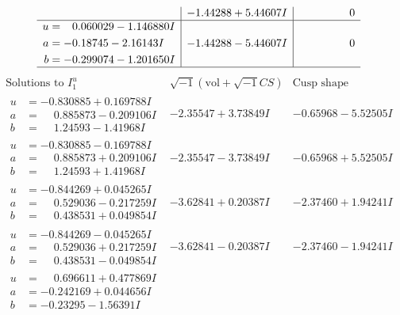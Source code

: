 \documentclass[1p]{elsarticle_modified}
\theoremstyle{definition}
\newcommand{\I}{\sqrt{-1}}
\begin{document}
$$\begin{array}{c|c|c}
 & -1.44288 + 5.44607 I & \phantom{-0.000000 } 0 \\ \hline\begin{aligned}
u &= \phantom{-}0.060029 - 1.146880 I \\
a &= -0.18745 - 2.16143 I \\
b &= -0.299074 - 1.201650 I\end{aligned}
 & -1.44288 - 5.44607 I & \phantom{-0.000000 } 0\\
 \hline 
 \end{array}$$\newpage$$\begin{array}{c|c|c}  
\text{Solutions to }I^u_{1}& \I (\text{vol} + \sqrt{-1}CS) & \text{Cusp shape}\\
 \hline 
\begin{aligned}
u &= -0.830885 + 0.169788 I \\
a &= \phantom{-}0.885873 - 0.209106 I \\
b &= \phantom{-}1.24593 - 1.41968 I\end{aligned}
 & -2.35547 + 3.73849 I & -0.65968 - 5.52505 I \\ \hline\begin{aligned}
u &= -0.830885 - 0.169788 I \\
a &= \phantom{-}0.885873 + 0.209106 I \\
b &= \phantom{-}1.24593 + 1.41968 I\end{aligned}
 & -2.35547 - 3.73849 I & -0.65968 + 5.52505 I \\ \hline\begin{aligned}
u &= -0.844269 + 0.045265 I \\
a &= \phantom{-}0.529036 - 0.217259 I \\
b &= \phantom{-}0.438531 + 0.049854 I\end{aligned}
 & -3.62841 + 0.20387 I & -2.37460 + 1.94241 I \\ \hline\begin{aligned}
u &= -0.844269 - 0.045265 I \\
a &= \phantom{-}0.529036 + 0.217259 I \\
b &= \phantom{-}0.438531 - 0.049854 I\end{aligned}
 & -3.62841 - 0.20387 I & -2.37460 - 1.94241 I \\ \hline\begin{aligned}
u &= \phantom{-}0.696611 + 0.477869 I \\
a &= -0.242169 + 0.044656 I \\
b &= -0.23295 - 1.56391 I\end{aligned}

\end{array}$$
\end{document}
